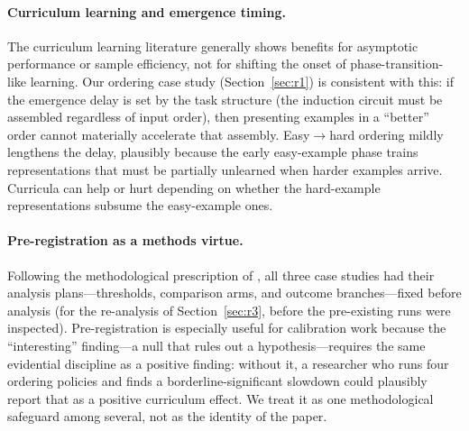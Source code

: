 \documentclass[11pt]{article}
\theoremstyle{plain}
\theoremstyle{definition}
\begin{document}
\paragraph{Curriculum learning and emergence timing.}
The curriculum learning literature \citep{bengio2009curriculum, soviany2022curriculum, wu2021curricula}
generally shows benefits for asymptotic performance or sample efficiency, not for
shifting the onset of phase-transition-like learning.
Our ordering case study (Section~\ref{sec:r1}) is consistent with this: if the emergence delay is set by the task
structure (the induction circuit must be assembled regardless of input order), then
presenting examples in a ``better'' order cannot materially accelerate that assembly.
Easy$\to$hard ordering mildly lengthens the delay, plausibly because the early
easy-example phase trains representations that must be partially unlearned when harder
examples arrive.
Curricula can help or hurt depending on
whether the hard-example representations subsume the easy-example ones.

\paragraph{Pre-registration as a methods virtue.}
Following the methodological prescription of \citet{pineau2021reproducibility},
all three case studies had their analysis plans---thresholds, comparison arms, and
outcome branches---fixed before analysis (for the re-analysis of
Section~\ref{sec:r3}, before the pre-existing runs were inspected).
Pre-registration is especially useful for calibration work because the
``interesting'' finding---a null that rules out a hypothesis---requires the same
evidential discipline as a positive finding: without it, a researcher who runs four ordering
policies and finds a borderline-significant slowdown could plausibly report that as a
positive curriculum effect. We treat it as one methodological safeguard among several, not
as the identity of the paper.
\end{document}
